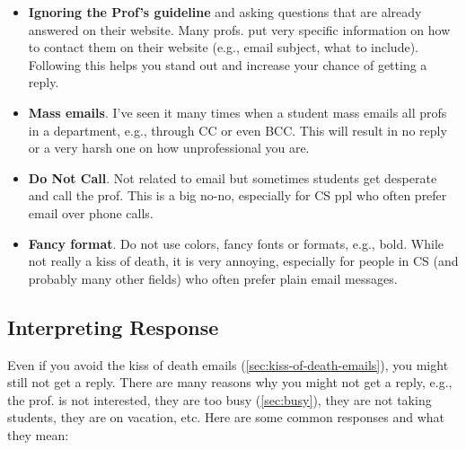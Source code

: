 \documentclass[oneside,11pt]{book}
\begin{document}
\begin{itemize}
    \item \textbf{Ignoring the Prof's guideline} and asking questions that are already answered on their website.  Many profs. put very specific information on how to contact them on their website (e.g., email subject, what to include).  Following this helps you stand out and increase your chance of getting a reply.
    
   
    \item \textbf{Mass emails}. I've seen it many times when a student mass emails all profs in a department, e.g., through CC or even BCC.  This will result in no reply or a very harsh one on how unprofessional you are.
    
    \item \textbf{Do Not Call}. Not related to email but sometimes students get desperate and call the prof.  This is a big no-no, especially for CS ppl who often prefer email over phone calls. 
    
    \item \textbf{Fancy format}.  Do not use colors, fancy fonts or formats, e.g., bold. While not really a kiss of death, it is very annoying, especially for people in CS (and probably many other fields) who often prefer plain email messages.    
\end{itemize}

\subsection{Interpreting Response}\label{sec:interpreting-response}
Even if you avoid the kiss of death emails (\autoref{sec:kiss-of-death-emails}), you might still not get a reply.  There are many reasons why you might not get a reply, e.g., the prof. is not interested, they are too busy (\autoref{sec:busy}), they are not taking students, they are on vacation, etc.  Here are some common responses and what they mean:
\end{document}
